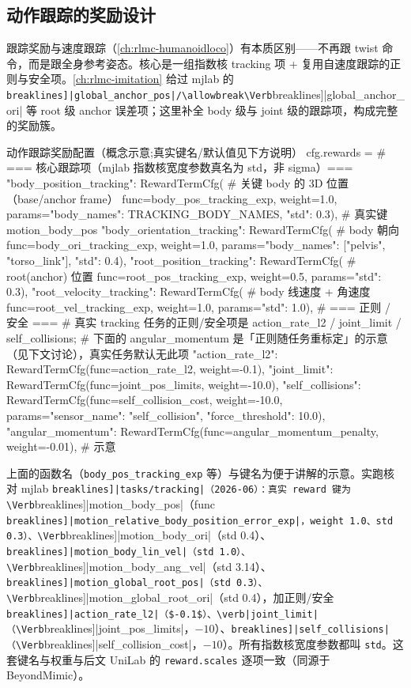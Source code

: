 \subsection{动作跟踪的奖励设计}
\label{sec:rlmc-mi-mjlab-reward}

跟踪奖励与速度跟踪（\cref{ch:rlmc-humanoidloco}）有本质区别——不再跟 twist 命令，而是跟全身参考姿态。核心是一组指数核 tracking 项 + 复用自速度跟踪的正则与安全项。\cref{ch:rlmc-imitation} 给过 mjlab 的 \Verb[breaklines]|global_anchor_pos|/\allowbreak\Verb[breaklines]|global_anchor_ori| 等 root 级 anchor 误差项；这里补全 body 级与 joint 级的跟踪项，构成完整的奖励簇。

\begin{codebox}[Python]{动作跟踪奖励配置（概念示意;真实键名/默认值见下方说明）}
cfg.rewards = {
    # === 核心跟踪项（mjlab 指数核宽度参数真名为 std，非 sigma）===
    "body_position_tracking":  RewardTermCfg(   # 关键 body 的 3D 位置（base/anchor frame）
        func=body_pos_tracking_exp, weight=1.0,
        params={"body_names": TRACKING_BODY_NAMES, "std": 0.3}),     # 真实键 motion_body_pos
    "body_orientation_tracking": RewardTermCfg( # body 朝向
        func=body_ori_tracking_exp, weight=1.0,
        params={"body_names": ["pelvis", "torso_link"], "std": 0.4}),
    "root_position_tracking":  RewardTermCfg(   # root(anchor) 位置
        func=root_pos_tracking_exp, weight=0.5, params={"std": 0.3}),
    "root_velocity_tracking":  RewardTermCfg(   # body 线速度 + 角速度
        func=root_vel_tracking_exp, weight=1.0, params={"std": 1.0}),
    # === 正则 / 安全 ===
    # 真实 tracking 任务的正则/安全项是 action_rate_l2 / joint_limit / self_collisions;
    # 下面的 angular_momentum 是「正则随任务重标定」的示意（见下文讨论），真实任务默认无此项
    "action_rate_l2":   RewardTermCfg(func=action_rate_l2, weight=-0.1),
    "joint_limit":      RewardTermCfg(func=joint_pos_limits, weight=-10.0),
    "self_collisions":  RewardTermCfg(func=self_collision_cost, weight=-10.0,
        params={"sensor_name": "self_collision", "force_threshold": 10.0}),
    "angular_momentum": RewardTermCfg(func=angular_momentum_penalty, weight=-0.01),  # 示意
}
\end{codebox}

\begin{note}
上面的函数名（\texttt{body\_pos\_tracking\_exp} 等）与键名为便于讲解的示意。实跑核对 mjlab \Verb[breaklines]|tasks/tracking|（2026-06）：真实 reward 键为 \Verb[breaklines]|motion_body_pos|（func \Verb[breaklines]|motion_relative_body_position_error_exp|，weight 1.0、std 0.3）、\Verb[breaklines]|motion_body_ori|（std 0.4）、\Verb[breaklines]|motion_body_lin_vel|（std 1.0）、\Verb[breaklines]|motion_body_ang_vel|（std 3.14）、\Verb[breaklines]|motion_global_root_pos|（std 0.3）、\Verb[breaklines]|motion_global_root_ori|（std 0.4），加正则/安全 \Verb[breaklines]|action_rate_l2|（$-0.1$）、\verb|joint_limit|（\Verb[breaklines]|joint_pos_limits|，$-10$）、\Verb[breaklines]|self_collisions|（\Verb[breaklines]|self_collision_cost|，$-10$）。所有指数核宽度参数都叫 \verb|std|。这套键名与权重与后文 UniLab 的 \verb|reward.scales| 逐项一致（同源于 BeyondMimic）。
\end{note}

